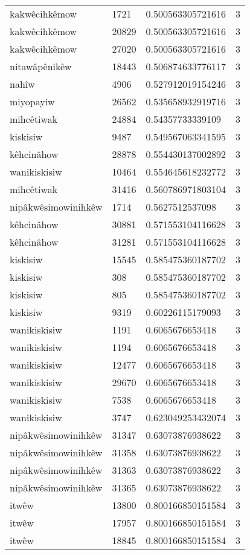 \begin{longtable}{llll}
kakwêcihkêmow & 1721 & 0.500563305721616 & 3 \\
kakwêcihkêmow & 20829 & 0.500563305721616 & 3 \\
kakwêcihkêmow & 27020 & 0.500563305721616 & 3 \\
nitawâpênikêw & 18443 & 0.506874633776117 & 3 \\
nahîw & 4906 & 0.527912019154246 & 3 \\
miyopayiw & 26562 & 0.535658932919716 & 3 \\
mihcêtiwak & 24884 & 0.54357733339109 & 3 \\
kiskisiw & 9487 & 0.549567063341595 & 3 \\
kêhcinâhow & 28878 & 0.554430137002892 & 3 \\
wanikiskisiw & 10464 & 0.554645618232772 & 3 \\
mihcêtiwak & 31416 & 0.560786971803104 & 3 \\
nipâkwêsimowinihkêw & 1714 & 0.5627512537098 & 3 \\
kêhcinâhow & 30881 & 0.571553104116628 & 3 \\
kêhcinâhow & 31281 & 0.571553104116628 & 3 \\
kiskisiw & 15545 & 0.585475360187702 & 3 \\
kiskisiw & 308 & 0.585475360187702 & 3 \\
kiskisiw & 805 & 0.585475360187702 & 3 \\
kiskisiw & 9319 & 0.60226115179093 & 3 \\
wanikiskisiw & 1191 & 0.6065676653418 & 3 \\
wanikiskisiw & 1194 & 0.6065676653418 & 3 \\
wanikiskisiw & 12477 & 0.6065676653418 & 3 \\
wanikiskisiw & 29670 & 0.6065676653418 & 3 \\
wanikiskisiw & 7538 & 0.6065676653418 & 3 \\
wanikiskisiw & 3747 & 0.623049253432074 & 3 \\
nipâkwêsimowinihkêw & 31347 & 0.63073876938622 & 3 \\
nipâkwêsimowinihkêw & 31358 & 0.63073876938622 & 3 \\
nipâkwêsimowinihkêw & 31363 & 0.63073876938622 & 3 \\
nipâkwêsimowinihkêw & 31365 & 0.63073876938622 & 3 \\
itwêw & 13800 & 0.800166850151584 & 3 \\
itwêw & 17957 & 0.800166850151584 & 3 \\
itwêw & 18845 & 0.800166850151584 & 3 \\

\end{longtable}
